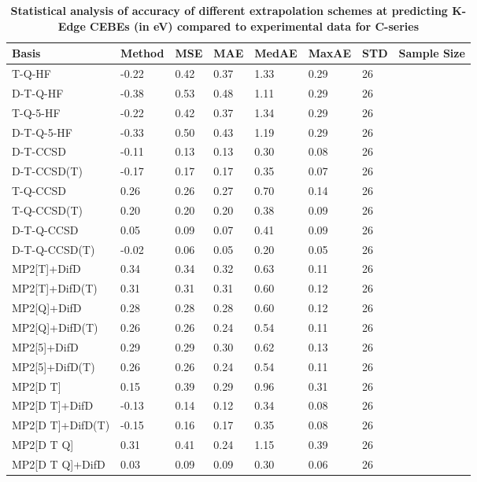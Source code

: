 \begin{table}
  \caption{\textbf{Statistical analysis of accuracy of different extrapolation schemes at predicting K-Edge CEBEs (in eV) compared to experimental data for C-series}}
  \label{tbl:extrap-scheme-summary-c}
  \begin{tabular}{l l l l l l l l }
    \toprule
    \textbf{Basis} & \textbf{Method} & \textbf{MSE} & \textbf{MAE} & \textbf{MedAE} & \textbf{MaxAE} & \textbf{STD} & \textbf{Sample Size} \\ 
    \midrule
    T-Q-HF & -0.22 & 0.42 & 0.37 & 1.33 & 0.29 & 26 \\ 
    D-T-Q-HF & -0.38 & 0.53 & 0.48 & 1.11 & 0.29 & 26 \\ 
    T-Q-5-HF & -0.22 & 0.42 & 0.37 & 1.34 & 0.29 & 26 \\ 
    D-T-Q-5-HF & -0.33 & 0.50 & 0.43 & 1.19 & 0.29 & 26 \\ 
    D-T-CCSD & -0.11 & 0.13 & 0.13 & 0.30 & 0.08 & 26 \\ 
    D-T-CCSD(T) & -0.17 & 0.17 & 0.17 & 0.35 & 0.07 & 26 \\ 
    T-Q-CCSD & 0.26 & 0.26 & 0.27 & 0.70 & 0.14 & 26 \\ 
    T-Q-CCSD(T) & 0.20 & 0.20 & 0.20 & 0.38 & 0.09 & 26 \\ 
    D-T-Q-CCSD & 0.05 & 0.09 & 0.07 & 0.41 & 0.09 & 26 \\ 
    D-T-Q-CCSD(T) & -0.02 & 0.06 & 0.05 & 0.20 & 0.05 & 26 \\ 
    MP2[T]+DifD & 0.34 & 0.34 & 0.32 & 0.63 & 0.11 & 26 \\ 
    MP2[T]+DifD(T) & 0.31 & 0.31 & 0.31 & 0.60 & 0.12 & 26 \\ 
    MP2[Q]+DifD & 0.28 & 0.28 & 0.28 & 0.60 & 0.12 & 26 \\ 
    MP2[Q]+DifD(T) & 0.26 & 0.26 & 0.24 & 0.54 & 0.11 & 26 \\ 
    MP2[5]+DifD & 0.29 & 0.29 & 0.30 & 0.62 & 0.13 & 26 \\ 
    MP2[5]+DifD(T) & 0.26 & 0.26 & 0.24 & 0.54 & 0.11 & 26 \\ 
    MP2[D T] & 0.15 & 0.39 & 0.29 & 0.96 & 0.31 & 26 \\ 
    MP2[D T]+DifD & -0.13 & 0.14 & 0.12 & 0.34 & 0.08 & 26 \\ 
    MP2[D T]+DifD(T) & -0.15 & 0.16 & 0.17 & 0.35 & 0.08 & 26 \\ 
    MP2[D T Q] & 0.31 & 0.41 & 0.24 & 1.15 & 0.39 & 26 \\ 
    MP2[D T Q]+DifD & 0.03 & 0.09 & 0.09 & 0.30 & 0.06 & 26 \\ 

\end{tabular}
\end{table}
